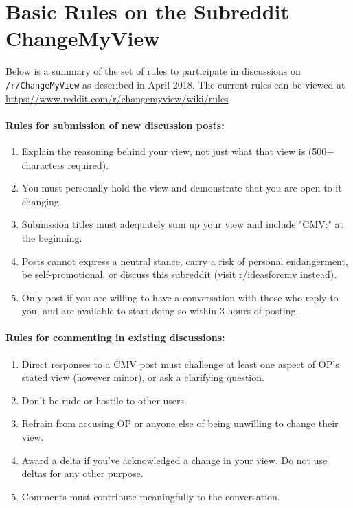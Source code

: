 

\section{Basic Rules on the Subreddit ChangeMyView}

Below is a summary of the set of rules to participate in discussions on \texttt{/r/ChangeMyView} as described in April 2018. The current rules can be viewed at \url{https://www.reddit.com/r/changemyview/wiki/rules}

\paragraph{Rules for submission of new discussion posts:}
\begin{enumerate}[A]\singlespacing
\item Explain the reasoning behind your view, not just what that view is (500+ characters required).
\item You must personally hold the view and demonstrate that you are open to it changing.
\item Submission titles must adequately sum up your view and include "CMV:" at the beginning.
\item Posts cannot express a neutral stance, carry a risk of personal endangerment, be self-promotional, or discuss this subreddit (visit r/ideasforcmv instead).
\item Only post if you are willing to have a conversation with those who reply to you, and are available to start doing so within 3 hours of posting.
\end{enumerate}

\paragraph{Rules for commenting in existing discussions:}
\begin{enumerate}[1]\singlespacing
\item Direct responses to a CMV post must challenge at least one aspect of OP’s stated view (however minor), or ask a clarifying question.
\item Don't be rude or hostile to other users.
\item Refrain from accusing OP or anyone else of being unwilling to change their view.
\item Award a delta if you've acknowledged a change in your view. Do not use deltas for any other purpose.
\item Comments must contribute meaningfully to the conversation.
\end{enumerate}



